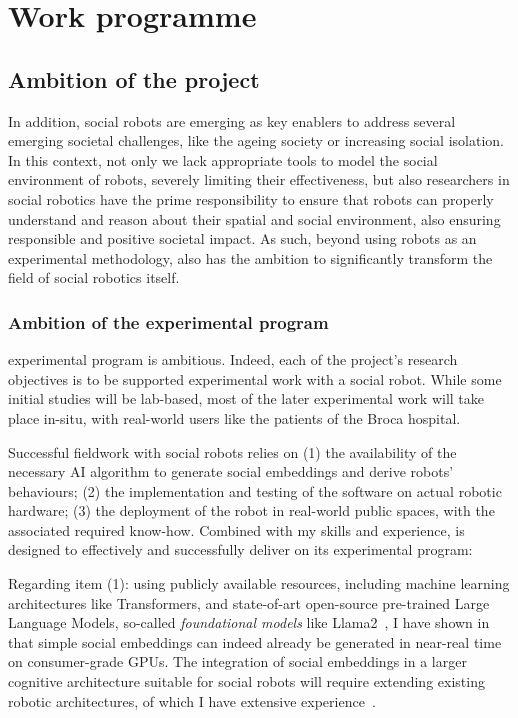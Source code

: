 \section{Work programme}


\subsection{Ambition of the project}

In addition, social robots are emerging as key enablers to address several
emerging societal challenges, like the ageing society or increasing social
isolation. In this context, not only we lack appropriate tools to model the
social environment of robots, severely limiting their effectiveness, but also
researchers in social robotics have the prime responsibility to ensure that
robots can properly understand and reason about their spatial and social
environment, also ensuring responsible and positive societal impact. As such,
beyond using robots as an experimental methodology, \project also has the
ambition to significantly transform the field of social robotics itself.


\subsubsection{Ambition of the experimental program}

\project experimental program is ambitious. Indeed, each of the project's
research objectives is to be supported experimental work with
a social robot. While some initial studies will be lab-based, most of the later
experimental work will take place in-situ, with real-world users like the
patients of the Broca hospital.

Successful fieldwork with social robots relies on (1) the availability of
the necessary AI algorithm to generate social embeddings and derive robots'
behaviours; (2) the implementation and testing of the software on actual robotic
hardware; (3) the deployment of the robot in real-world public spaces, with the
associated required know-how. Combined with my skills and experience, \project
is designed to effectively and successfully deliver on its experimental program:

Regarding item (1): using publicly available resources, including machine
learning architectures like Transformers, and state-of-art open-source
pre-trained Large Language Models, so-called \emph{foundational models} like
Llama2~\cite{touvron2023llama}, I have shown in~\cite{lemaignan2024social} that
simple social embeddings can indeed already be generated in near-real time on
consumer-grade GPUs. The integration of social embeddings in a larger cognitive
architecture suitable for social robots will require extending existing
robotic architectures, of which I have extensive
experience~\cite{lemaignan2017artificial, lemaignan2015pyrobots,
baxter2016cognitive,lemaignan2014challenges,lemaignan2011what}.

